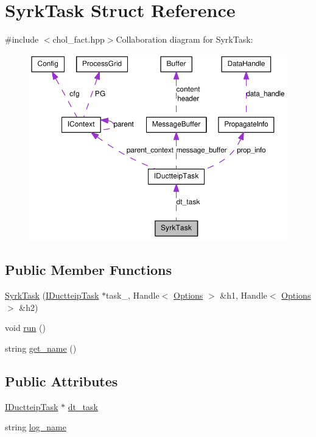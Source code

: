 \hypertarget{struct_syrk_task}{
\section{SyrkTask Struct Reference}
\label{struct_syrk_task}
}


{\ttfamily \#include $<$chol\_\-fact.hpp$>$}Collaboration diagram for SyrkTask:\nopagebreak
\begin{figure}[H]
\begin{center}
\leavevmode
\includegraphics[width=394pt]{struct_syrk_task__coll__graph}
\end{center}
\end{figure}
\subsection*{Public Member Functions}
\begin{DoxyCompactItemize}
\item 
\hyperlink{struct_syrk_task_a6c05d54b933ad7852df53801c91d56c9}{SyrkTask} (\hyperlink{class_i_ductteip_task}{IDuctteipTask} $\ast$task\_\-, Handle$<$ \hyperlink{struct_options}{Options} $>$ \&h1, Handle$<$ \hyperlink{struct_options}{Options} $>$ \&h2)
\item 
void \hyperlink{struct_syrk_task_af42d38cd71c443635346e4280b28c8c7}{run} ()
\item 
string \hyperlink{struct_syrk_task_a7cf940cf2e3a008e1c7d478d7da78042}{get\_\-name} ()
\end{DoxyCompactItemize}
\subsection*{Public Attributes}
\begin{DoxyCompactItemize}
\item 
\hyperlink{class_i_ductteip_task}{IDuctteipTask} $\ast$ \hyperlink{struct_syrk_task_aea7818766634413ae5832d5809789dc4}{dt\_\-task}
\item 
string \hyperlink{struct_syrk_task_a9a6506fac25b5de8f9da7d65c6404879}{log\_\-name}
\end{DoxyCompactItemize}


